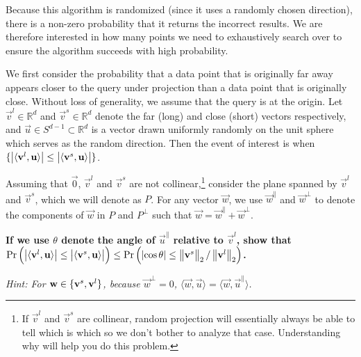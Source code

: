 \documentclass[preview]{standalone}
\begin{document}
\begin{Parts}
Because this algorithm is randomized (since it uses a randomly chosen direction), there is a non-zero probability that it returns the incorrect results. We are therefore interested in how many points we need to exhaustively search over to ensure the algorithm succeeds with high probability.

We first consider 
the probability that a data point that is originally far away appears closer to the query under projection than a data point that is originally close. 
Without loss of generality, we assume that the query is at the origin. 
Let $\vec{v}^{l}\in\mathbb{R}^{d}$ and $\vec{v}^{s}\in\mathbb{R}^{d}$ denote the far (long) and close (short) vectors respectively, and $\vec{u}\in S^{d-1}\subset\mathbb{R}^{d}$ is a vector drawn uniformly randomly on the unit sphere which serves as the random direction.
Then the event of interest is when $\{\left|\langle\vec{v}^{l},\vec{u}\rangle\right|\leq\left|\langle\vec{v}^{s}\vphantom{v^{l}},\vec{u}\rangle\right|\}$.

Assuming that $\vec{0}$, $\vec{v}^{l}$ and $\vec{v}^{s}$ are not collinear,\footnote{If $\vec{v}^{l}$ and $\vec{v}^{s}$ are collinear, random projection will essentially always be able to tell which is which so we don't bother to analyze that case. Understanding why will help you do this problem.} consider the plane spanned by $\vec{v}^{l}$ and $\vec{v}^{s}$, which we will denote as $P$.
For any vector $\vec{w}$, we use $\vec{w}^{\parallel}$ and $\vec{w}^{\perp}$ to denote the components of $\vec{w}$ in $P$ and $P^{\perp}$ such that $\vec{w}=\vec{w}^{\parallel}+\vec{w}^{\perp}$. 

{\bf If we use $\theta$ denote the angle of $\vec{u}^{\parallel}$ relative to $\vec{v}^{l}$, show that $\mathrm{Pr}\left(\left|\langle\vec{v}^{l},\vec{u}\rangle\right|\leq\left|\langle\vec{v}^{s}\vphantom{v^{l}},\vec{u}\rangle\right|\right) \leq \mathrm{Pr}\left(\left|\cos\theta\right| \leq \left\Vert \vec{v}^{s}\vphantom{v^{l}}\right\Vert _{2} / \left\Vert \vec{v}^{l}\right\Vert _{2}\right)$.}

\emph{Hint: For $\vec{w}\in\{\vec{v}^{s}\vphantom{v^{l}},\vec{v}^{l}\}$, because $\vec{w}^{\perp}=0$, $\langle\vec{w},\vec{u}\rangle=\langle\vec{w},\vec{u}^{\parallel}\rangle$. }


\end{Parts}
\end{document}
